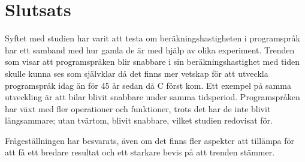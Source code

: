 \documentclass[12pt,swedish]{article}
\begin{document}
\section{Slutsats}
Syftet med studien har varit att testa om beräkningshastigheten i programspråk har ett samband med hur gamla de är med hjälp av olika experiment. Trenden som visar att programspråken blir snabbare i sin beräkningshastighet med tiden skulle kunna ses som självklar då det finns mer vetskap för att utveckla programspråk idag än för 45 år sedan då C först kom. Ett exempel på samma utveckling är att bilar blivit snabbare under samma tidsperiod. Programspråken har växt med fler operationer och funktioner, trots det har de inte blivit långsammare; utan tvärtom, blivit snabbare, vilket studien redovisat för.

Frågeställningen har besvarats, även om det finns fler aspekter att tillämpa för att få ett bredare resultat och ett starkare bevis på att trenden stämmer.

\printbibliography
\end{document}
